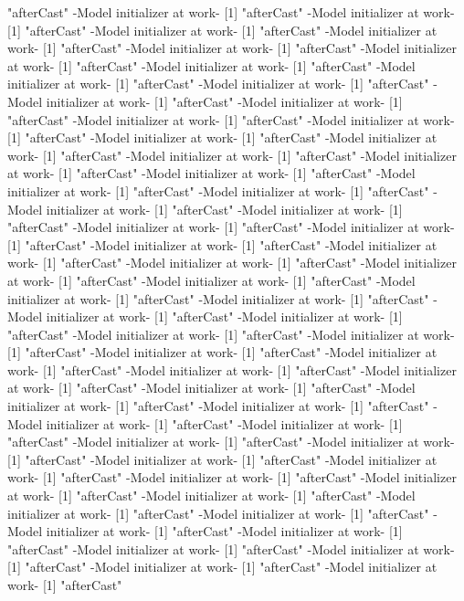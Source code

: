 \documentclass[a4paper]{article}
\begin{document}
\begin{Schunk}
\begin{Soutput}
[1] "afterCast"
-Model initializer at work-
[1] "afterCast"
-Model initializer at work-
[1] "afterCast"
-Model initializer at work-
[1] "afterCast"
-Model initializer at work-
[1] "afterCast"
-Model initializer at work-
[1] "afterCast"
-Model initializer at work-
[1] "afterCast"
-Model initializer at work-
[1] "afterCast"
-Model initializer at work-
[1] "afterCast"
-Model initializer at work-
[1] "afterCast"
-Model initializer at work-
[1] "afterCast"
-Model initializer at work-
[1] "afterCast"
-Model initializer at work-
[1] "afterCast"
-Model initializer at work-
[1] "afterCast"
-Model initializer at work-
[1] "afterCast"
-Model initializer at work-
[1] "afterCast"
-Model initializer at work-
[1] "afterCast"
-Model initializer at work-
[1] "afterCast"
-Model initializer at work-
[1] "afterCast"
-Model initializer at work-
[1] "afterCast"
-Model initializer at work-
[1] "afterCast"
-Model initializer at work-
[1] "afterCast"
-Model initializer at work-
[1] "afterCast"
-Model initializer at work-
[1] "afterCast"
-Model initializer at work-
[1] "afterCast"
-Model initializer at work-
[1] "afterCast"
-Model initializer at work-
[1] "afterCast"
-Model initializer at work-
[1] "afterCast"
-Model initializer at work-
[1] "afterCast"
-Model initializer at work-
[1] "afterCast"
-Model initializer at work-
[1] "afterCast"
-Model initializer at work-
[1] "afterCast"
-Model initializer at work-
[1] "afterCast"
-Model initializer at work-
[1] "afterCast"
-Model initializer at work-
[1] "afterCast"
-Model initializer at work-
[1] "afterCast"
-Model initializer at work-
[1] "afterCast"
-Model initializer at work-
[1] "afterCast"
-Model initializer at work-
[1] "afterCast"
-Model initializer at work-
[1] "afterCast"
-Model initializer at work-
[1] "afterCast"
-Model initializer at work-
[1] "afterCast"
-Model initializer at work-
[1] "afterCast"
-Model initializer at work-
[1] "afterCast"
-Model initializer at work-
[1] "afterCast"
-Model initializer at work-
[1] "afterCast"
-Model initializer at work-
[1] "afterCast"
-Model initializer at work-
[1] "afterCast"
-Model initializer at work-
[1] "afterCast"
-Model initializer at work-
[1] "afterCast"
-Model initializer at work-
[1] "afterCast"
-Model initializer at work-
[1] "afterCast"
-Model initializer at work-
[1] "afterCast"
-Model initializer at work-
[1] "afterCast"
-Model initializer at work-
[1] "afterCast"
-Model initializer at work-
[1] "afterCast"
-Model initializer at work-
[1] "afterCast"
-Model initializer at work-
[1] "afterCast"
-Model initializer at work-
[1] "afterCast"
-Model initializer at work-
[1] "afterCast"

\end{Soutput}
\end{Schunk}
\end{document}
